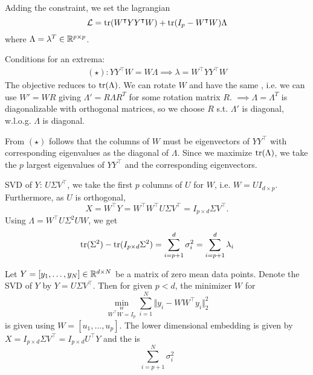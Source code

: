 Adding the constraint, we set the lagrangian 
\[\mathcal{L}=\text{tr}(W^\intercal YY^\intercal W)+\text{tr}(I_p-W^\intercal W)\Lambda\]
where $\Lambda=\lambda^T\in\mathbb{R}^{p\times p}$.

Conditions for an extrema:
\begin{align*}
    (\star):YY^\intercal W = W\Lambda\implies \lambda=W^\intercal YY^\intercal W
\end{align*}
The objective reduces to $\text{tr}(\Lambda)$. We can rotate $W$ and have the same ,
i.e. we can use $W'=WR$ giving $\Lambda'=R\Lambda R^T$ for some rotation matrix $R$.
$\implies \Lambda=\Lambda^T$ is diagonalizable with orthogonal matrices, so we choose $R$ s.t. 
$\Lambda'$ is diagonal, w.l.o.g. $\Lambda$ is diagonal.

From $(\star)$ follows that the columns of $W$ must be eigenvectors of $YY^\intercal$ with 
corresponding eigenvalues as the diagonal of $\Lambda$. Since we maximize $\text{tr}(\Lambda)$, we 
take the $p$ largest eigenvalues of $YY^\intercal$ and the corresponding eigenvectors.

SVD of $Y$: $U\Sigma V^\intercal$, we take the first $p$ columns of $U$ for $W$, i.e. $W=UI_{d\times p}$.
Furthermore, as $U$ is orthogonal,
\[X=W^\intercal Y=W^\intercal W^\intercal U \Sigma V^\intercal=I_{p\times d}\Sigma V^\intercal.\]
Using $\Lambda=W^\intercal U\Sigma^2 U W$, we get 
\[\text{tr}(\Sigma^2)-\text{tr}(I_{p\times d}\Sigma^2)=\sum_{i=p+1}^d \sigma_i^2=\sum_{i=p+1}^d \lambda_i\]

\begin{theorem}\label{thm:2.1}
    Let $Y=[y_1,\dots,y_N]\in\mathbb{R}^{d\times N}$ be a matrix of zero mean data points. Denote the SVD of 
    $Y$ by $Y=U\Sigma V^\intercal$. Then for given $p<d$, the minimizer $W$ for 
    \[\min_{\stackrel{W}{W^\intercal W=I_p}}\sum_{i=1}^N\Vert y_i-WW^\intercal y_i\Vert_2^2\]
    is given using $W=[u_1,\dots,u_p]$. The lower dimensional embedding is given by 
    $X=I_{p\times d}\Sigma V^\intercal=I_{p\times d}U^\intercal Y$ and the  
    is \[\sum_{i=p+1}^N\sigma_i^2\]
\end{theorem}







